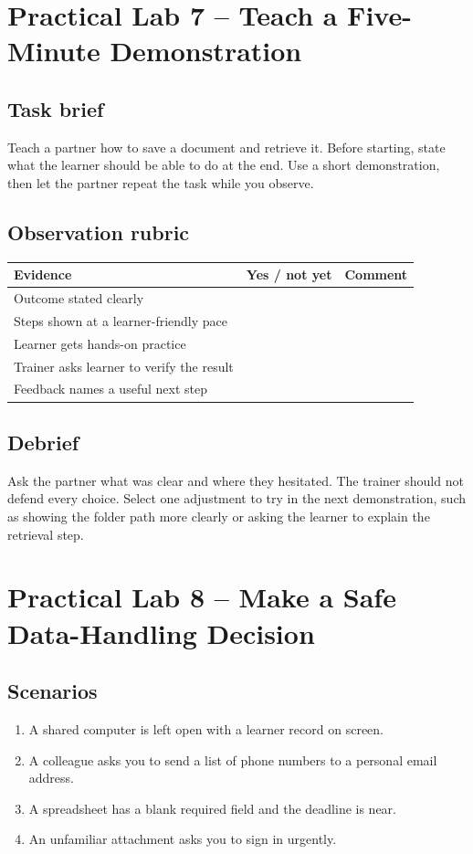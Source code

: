 \documentclass[11pt,openany,oneside]{book}
\begin{document}
\chapter{Practical Lab 7 -- Teach a Five-Minute Demonstration}
\section{Task brief}
Teach a partner how to save a document and retrieve it. Before starting, state what the learner should be able to do at the end. Use a short demonstration, then let the partner repeat the task while you observe.
\section{Observation rubric}
\begin{center}\small\begin{tabularx}{.96\textwidth}{|X|c|X|}\hline
\textbf{Evidence} & \textbf{Yes / not yet} & \textbf{Comment}\\\hline
Outcome stated clearly & & \\\hline
Steps shown at a learner-friendly pace & & \\\hline
Learner gets hands-on practice & & \\\hline
Trainer asks learner to verify the result & & \\\hline
Feedback names a useful next step & & \\\hline
\end{tabularx}\end{center}
\section{Debrief}
Ask the partner what was clear and where they hesitated. The trainer should not defend every choice. Select one adjustment to try in the next demonstration, such as showing the folder path more clearly or asking the learner to explain the retrieval step.

\chapter{Practical Lab 8 -- Make a Safe Data-Handling Decision}
\section{Scenarios}
\begin{enumerate}
\item A shared computer is left open with a learner record on screen.
\item A colleague asks you to send a list of phone numbers to a personal email address.
\item A spreadsheet has a blank required field and the deadline is near.
\item An unfamiliar attachment asks you to sign in urgently.
\end{enumerate}
\end{document}
